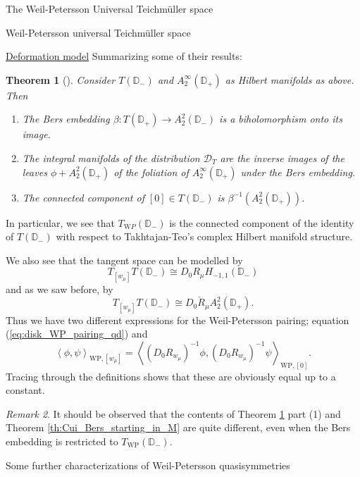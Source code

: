 \documentclass[12pt]{amsart}
\newcommand{\disk}{\ensuremath{\mathbb{D}} } %
\theoremstyle{plain}
\newtheorem{theorem}{Theorem}[section]
\theoremstyle{definition}
\theoremstyle{remark}
\newtheorem{remark}[theorem]{Remark}
\numberwithin{equation}{section} %
\numberwithin{figure}{section} %
\begin{document}
\begin{section}{The Weil-Petersson Universal Teichm\"uller space}
\begin{subsection}{Weil-Petersson universal Teichm\"uller space}
\begin{subsubsection}{{\underline{Deformation model}}}
   Summarizing some of their results:
   \begin{theorem}[\cite{Takhtajan_Teo_Memoirs}] \label{th:TT_Bers_embedding} 
    Consider $T(\disk_-)$ and $A_2^\infty(\disk_+)$ as Hilbert manifolds as above. Then 
     \begin{enumerate}[font=\upshape]
      \item The Bers embedding $\beta:T(\disk_+) \rightarrow A_2^2(\disk_-)$ is a biholomorphism onto its image. 
      \item The integral manifolds of the distribution $\mathcal{D}_T$ are the  inverse images of the leaves $\phi + A_2^2(\disk_+)$ of the foliation of $A_2^\infty(\disk_+)$ under the Bers embedding. 
      \item The connected component of $[0] \in T(\disk_-)$ is $\beta^{-1}(A_2^2(\disk_+))$. 
     \end{enumerate}
   \end{theorem}
   In particular, we see that $T_{\mathrm WP}(\disk_-)$ is the connected component of the identity of $T(\disk_-)$ with respect to Takhtajan-Teo's complex Hilbert manifold structure.  
   
   We also see that the tangent space can be modelled by 
   \[   T_{[w_\mu]} T(\disk_-) \cong  D_0 R_{\mu} H_{-1,1}(\disk_-)   \]
   and as we saw before, by
   \[  T_{[w_\mu]} T(\disk_-) \cong  D_0 \check{R}_{\mu} A_2^2(\disk_+).  \]
   Thus we have two different expressions for the Weil-Petersson pairing; 
   equation (\ref{eq:disk_WP_pairing_qd}) and 
   \begin{equation}  \label{eq:disk_WP_pairing_bd}
     \left< \phi,\psi \right>_{\mathrm{WP},[w_\mu]} = \left< (D_{0} R_{w_\mu})^{-1} \phi, (D_{0} R_{w_\mu})^{-1} \psi \right>_{\mathrm{WP},[0]}.
   \end{equation} 
   Tracing through the definitions shows that these are obviously equal up to a constant. 

   
   \begin{remark}
    It should be observed that the contents of Theorem \ref{th:TT_Bers_embedding} part (1) and Theorem \ref{th:Cui_Bers_starting_in_M} are quite different, even when the Bers embedding is restricted to $T_{\mathrm{WP}}(\disk_-)$. 
   \end{remark}
\end{subsubsection}  
\end{subsection} 

\begin{subsection}{Some further characterizations of Weil-Petersson quasisymmetries}\label{Further char} 


\end{subsection}
\end{section}
\end{document}
